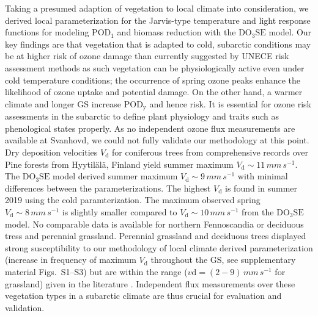 \documentclass[bg, manuscript]{copernicus}
\begin{document}
Taking a presumed adaption of vegetation to local climate into consideration, we derived local parameterization for the Jarvis-type temperature and light response functions for modeling $\mathrm{POD_1}$ and biomass reduction with the $\mathrm{DO_3SE}$ model. Our key findings are that vegetation that is adapted to cold, subarctic conditions may be at higher risk of ozone damage than currently suggested by UNECE risk assessment methods as such vegetation can be physiologically active even under cold temperature conditions; the occurrence of spring ozone peaks enhance the likelihood of ozone uptake and potential damage. On the other hand, a warmer climate and longer GS increase $\mathrm{POD_y}$ and hence risk. It is essential for ozone risk assessments in the subarctic to define plant physiology and traits such as phenological states properly. As no independent ozone flux measurements are available at Svanhovd, we could not fully validate our methodology at this point. 
Dry deposition velocities $V_\mathrm{d}$ for coniferous trees from comprehensive records over Pine forests from Hyytilälä, Finland \citep{BER:Keronen2003} yield summer maximum $V_\mathrm{d}\sim 11\,\unit{mm\,s^{-1}}$. The $\mathrm{DO_3SE}$ model derived summer maximum $V_\mathrm{d}\sim 9\,\unit{mm\,s^{-1}}$ with minimal differences between the parameterizations. The highest $V_\mathrm{d}$ is found in summer 2019 using the cold paramterization. The maximum observed spring $V_\mathrm{d}\sim 8\,\unit{mm\,s^{-1}}$ is slightly smaller compared to $V_\mathrm{d}\sim 10\,\unit{mm\,s^{-1}}$ from the $\mathrm{DO_3SE}$ model. No comparable data is available for northern Fennoscandia or deciduous tress and perennial grassland. Perennial grassland and deciduous trees displayed strong susceptibility to our methodology of local climate derived parameterization (increase in frequency of maximum $V_\mathrm{d}$ throughout the GS, see supplementary material Figs.~S1--S3) but are within the range ($v\mathrm{d} = (2-9)\,\unit{mm\,s^{-1}}$ for grassland) given in the literature \citep[e.g.][]{JGR:Jacob1992,AE:Padro1996,RG:Clifton2020}. Independent flux measurements over these vegetation types in a subarctic climate are thus crucial for evaluation and validation. 
\end{document}
